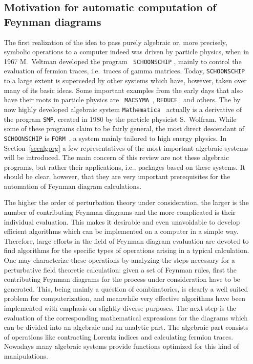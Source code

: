 \subsection{Motivation for automatic computation of Feynman diagrams}
%
The first realization of the idea to pass purely algebraic or, more
precisely, symbolic operations to a computer indeed was driven by
particle physics, when in 1967 M.~Veltman developed the program {\tt
  SCHOONSCHIP} \cite{VelSS}, mainly to control the evaluation of fermion
traces, i.e.\ traces of gamma matrices. Today, {\tt SCHOONSCHIP} to a
large extent is superceded by other systems which have, however, taken
over many of its basic ideas.  Some important examples from the early
days that also have their roots in particle physics are {\tt
  MACSYMA}~\cite{macsyma}, {\tt REDUCE}~\cite{reduce} and others. The by
now highly developed algebraic system {\tt Mathematica}~\cite{Wolfram}
actually is a derivative of the program {\tt SMP}, created in 1980 by
the particle physicist S.~Wolfram.  While some of these programs claim
to be fairly general, the most direct descendant of {\tt SCHOONSCHIP} is
{\tt FORM}~\cite{form}, a system mainly tailored to high energy physics.
In Section~\ref{secalgprg} a few representatives of the most important
algebraic systems will be introduced.  The main concern of this review
are not these algebraic programs, but rather their applications, i.e.,
packages based on these systems.  It should be clear, however, that they
are very important prerequisites for the automation of Feynman diagram
calculations.

The higher the order of perturbation theory under consideration, the
larger is the number of contributing Feynman diagrams and the more
complicated is their individual evaluation. This makes it desirable and
even unavoidable to develop efficient algorithms which can be
implemented on a computer in a simple way.  Therefore, large efforts in
the field of Feynman diagram evaluation are devoted to find algorithms
for the specific types of operations arising in a typical calculation.
One may characterize these operations by analyzing the steps necessary
for a perturbative field theoretic calculation: given a set of Feynman
rules, first the contributing Feynman diagrams for the process under
consideration have to be generated.  This, being mainly a question of
combinatorics, is clearly a well suited problem for computerization, and
meanwhile very effective algorithms have been implemented with emphasis
on slightly diverse purposes. The next step is the evaluation of the
corresponding mathematical expressions for the diagrams which can be
divided into an algebraic and an analytic part. The algebraic part
consists of operations like contracting Lorentz indices and calculating
fermion traces.  Nowadays many algebraic systems provide functions
optimized for this kind of manipulations.

